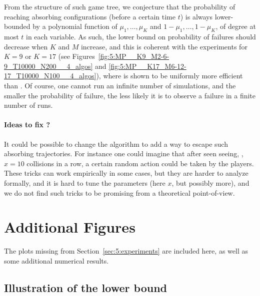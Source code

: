 From the structure of such game tree, we conjecture that the probability of reaching absorbing configurations (before a certain time $t$) is always lower-bounded
by a polynomial function of $\mu_1,\dots,\mu_K$ and $1-\mu_1,\dots,1-\mu_K$,
of degree at most $t$ in each variable.
%
As such, the lower bound on probability of failures should decrease when $K$ and $M$ increase, and this is coherent with the experiments for $K=9$ or $K=17$ (see Figures~\ref{fig:5:MP__K9_M2-6-9_T10000_N200__4_algos} and \ref{fig:5:MP__K17_M6-12-17_T10000_N100__4_algos}),
where \Selfish{} is shown to be uniformly more efficient than \rhoRand.
%
Of course, one cannot run an infinite number of simulations, and the smaller the probability of failure, the less likely it is to observe a failure
in a finite number of runs.

\paragraph{Ideas to fix \Selfish{} ?}
%
It could be possible to change the \Selfish{} algorithm to add a way to escape such absorbing trajectories.
For instance one could imagine that after seen seeing, \eg, $x=10$ collisions in a row,
a certain random action could be taken by the players.
These tricks can work empirically in some cases,
but they are harder to analyze formally,
and it is hard to tune the parameters (here $x$, but possibly more),
and we do not find such tricks to be promising from a theoretical point-of-view.



\section{Additional Figures}
\label{app:5:moreplots}

The plots missing from Section~\ref{sec:5:experiments} are included here,
as well as some additional numerical results.


\subsection{Illustration of the lower bound}
\label{app:5:illustrationLowerBound}

